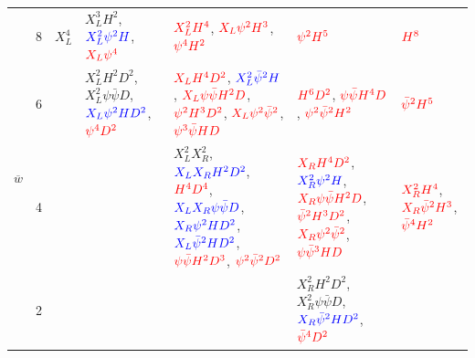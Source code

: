\begin{table}[H]
\begin{center}
\renewcommand{\arraystretch}{1.2}
\begin{tabular}[t]{c c *5{| p{2.35cm}} }
 & 8 &
$X_L^4$ & 
$X_L^3 H^2$, ${\color{blue} X_L^2 \psi^2 H}$, ${\color{red} X_L \psi^4}$        & 
${\color{red} X_L^2 H^4}$, ${\color{red} X_L \psi^2 H^3}$, ${\color{red}  \psi^4 H^2}$       &    
${\color{red} \psi^2 H^5}$      & 
${\color{red} H^8}$            \\ 
& 6 &
           & 
 $X_L^2 H^2 D^2$, $X_L^2 \psi \bar \psi D$, ${\color{blue} X_L \psi^2 H D^2}$, ${\color{red} \psi^4 D^2}$ & 
 ${\color{red}  X_L H^4 D^2}$, ${\color{blue} X_L^2 \bar \psi^2 H}$, ${\color{red}  X_L \psi \bar \psi H^2 D}$, ${\color{red}  \psi^2 H^3 D^2}$, ${\color{red}  X_L \psi^2 \bar \psi^2}$, ${\color{red}  \psi^3 \bar \psi H D}$   & 
 ${\color{red} H^6 D^2}$, ${\color{red} \psi \bar \psi H^4 D}$, ${\color{red} \psi^2 \bar \psi^2 H^2}$             &  
 $ {\color{red} \bar \psi^2 H^5}$                  \\ 
& 4 &           
           &                           
           & 
$X_L^2 X_R^2$, ${\color{blue} X_L X_R H^2 D^2}$, ${\color{red} H^4 D^4}$, ${\color{blue} X_L X_R \psi \bar \psi D}$, ${\color{blue} X_R \psi^2 H D^2}$, ${\color{blue} {\color{blue} X_L \bar \psi^2 H D^2}}$, ${\color{red} \psi \bar \psi H^2 D^3}$, ${\color{red} \psi^2 \bar \psi^2 D^2}$ & 
${\color{red}  X_R H^4 D^2}$, ${\color{blue} X_R^2 \psi^2 H}$, ${\color{red}  X_R \psi \bar \psi H^2 D}$, ${\color{red} \bar  \psi^2 H^3 D^2}$, ${\color{red}  X_R \psi^2 \bar \psi^2}$, ${\color{red}  \psi \bar \psi^3 H D}$     & 
${\color{red} X_R^2 H^4}$, ${\color{red} X_R \bar  \psi^2 H^3}$, ${\color{red} \bar \psi^4 H^2}$ \\ 
& 2 &          
           &                           
           &                         
           & 
$X_R^2 H^2 D^2$, $X_R^2 \psi \bar \psi D$, ${\color{blue} X_R \bar \psi^2 H D^2}$, $ {\color{red} \bar \psi^4 D^2}$ & 

\end{tabular}
\end{center}
\end{table}
